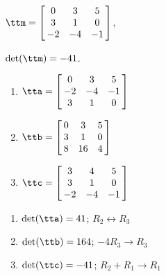 {$\ttm=\left[\hskip -3pt \begin{array}{ccc} 0&3&5\\  3&1&0
\\  -2&-4&-1\end{array}\hskip -3pt \right] $,

 $\det(\ttm)=-41$.
\begin{enumerate}
\item $\tta = \left[\hskip -3pt \begin{array}{ccc} 0&3&5\\  -2&-4&-1
\\  3&1&0\end{array}\hskip -3pt \right] $
\item	$\ttb = \left[\hskip -3pt \begin{array}{ccc} 0&3&5\\  3&1&0
\\  8&16&4\end{array}\hskip -3pt \right] $
\item	$\ttc = \left[\hskip -3pt \begin{array}{ccc} 3&4&5\\  3&1&0
\\  -2&-4&-1\end{array}\hskip -3pt \right] $
\end{enumerate}} 
{\begin{enumerate}
\item $\det(\tta) = 41$; $R_2\leftrightarrow R_3$
\item $\det(\ttb) = 164$; $-4R_3\rightarrow R_3$
\item $\det(\ttc) = -41$; $R_2+R_1\rightarrow R_1$
\end{enumerate}}



  

